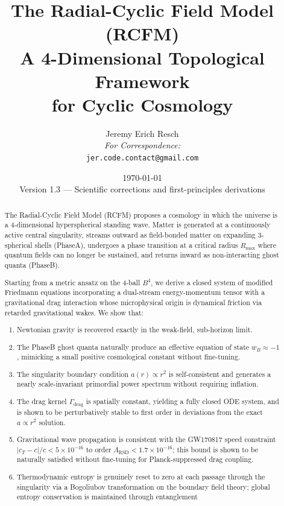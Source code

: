 \documentclass[10pt,twocolumn]{article}
\title{%
  \textbf{The Radial-Cyclic Field Model (RCFM)}\\[6pt]
  \large A 4-Dimensional Topological Framework\\
  for Cyclic Cosmology
}
\author{%
  Jeremy Erich Resch\\[4pt]
  \small \textit{For Correspondence:}\\
  \small \texttt{jer.code.contact@gmail.com}
}
\date{\today \\ \small Version 1.3 --- Scientific corrections and first-principles derivations}
\theoremstyle{definition}
\newcommand{\Rmax}{R_{\max}}
\newcommand{\Gammadrag}{\Gamma_{\mathrm{drag}}}
\begin{document}
\maketitle


\begin{abstract}
The Radial-Cyclic Field Model (RCFM) proposes a cosmology in
which the universe is a 4-dimensional hyperspherical standing
wave. Matter is generated at a continuously active central
singularity, streams outward as field-bonded matter on
expanding 3-spherical shells (Phase\nobreakspace{}A), undergoes a phase
transition at a critical radius \( \Rmax \) where quantum fields
can no longer be sustained, and returns inward as
non-interacting ghost quanta (Phase\nobreakspace{}B).

Starting from a metric ansatz on the 4-ball \( B^{4} \), we
derive a closed system of modified Friedmann equations
incorporating a dual-stream energy-momentum tensor with a
gravitational drag interaction whose microphysical origin is
dynamical friction via retarded gravitational wakes.  We show
that:
\begin{enumerate}[label=(\roman*)]
  \item Newtonian gravity is recovered exactly in the
    weak-field, sub-horizon limit.
  \item The Phase\nobreakspace{}B ghost quanta naturally produce an
    effective equation of state \( w_{B}\approx-1 \), mimicking
    a small positive cosmological constant without
    fine-tuning.
  \item The singularity boundary condition \( a(r)\propto r^{2} \)
    is self-consistent and generates a nearly scale-invariant
    primordial power spectrum without requiring inflation.
  \item The drag kernel \( \Gammadrag \) is spatially constant,
    yielding a fully closed ODE system, and is shown to be
    perturbatively stable to first order in deviations from
    the exact \( a\propto r^{2} \) solution.
  \item Gravitational wave propagation is consistent with
    the GW170817 speed constraint
    \( |c_{T}-c|/c<5\times10^{-16} \) to order
    \( \Lambda_{\mathrm{RSD}}<1.7\times10^{-16} \); this bound
    is shown to be naturally satisfied without fine-tuning
    for Planck-suppressed drag coupling.
  \item Thermodynamic entropy is genuinely reset to zero at
    each passage through the singularity via a Bogoliubov
    transformation on the boundary field theory; global
    entropy conservation is maintained through entanglement

\end{enumerate}
\end{abstract}
\end{document}
